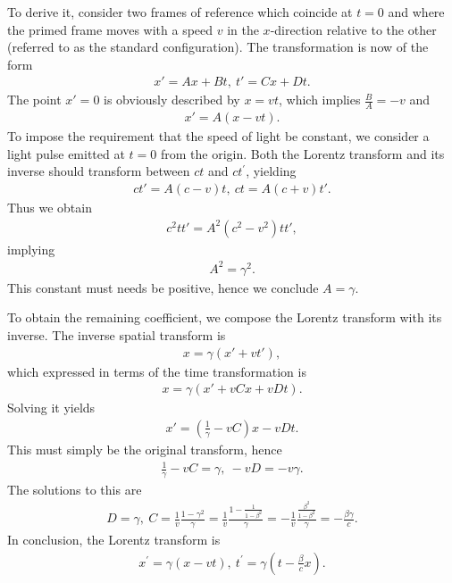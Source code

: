To derive it, consider two frames of reference which coincide at $t = 0$ and where the primed frame moves with a speed $v$ in the $x$-direction relative to the other (referred to as the standard configuration). The transformation is now of the form
\begin{align*}
	x' = Ax + Bt, \ t' = Cx + Dt.
\end{align*}
The point $x' = 0$ is obviously described by $x = vt$, which implies $\frac{B}{A} = -v$ and
\begin{align*}
	x' = A(x - vt).
\end{align*}
To impose the requirement that the speed of light be constant, we consider a light pulse emitted at $t = 0$ from the origin. Both the Lorentz transform and its inverse should transform between $ct$ and $ct^{\prime}$, yielding
\begin{align*}
	ct' = A(c - v)t, \ ct = A(c + v)t'.
\end{align*}
Thus we obtain
\begin{align*}
	c^{2}tt' = A^{2}(c^{2} - v^{2})tt',
\end{align*}
implying
\begin{align*}
	A^{2} = \gamma^{2}.
\end{align*}
This constant must needs be positive, hence we conclude $A = \gamma$.

To obtain the remaining coefficient, we compose the Lorentz transform with its inverse. The inverse spatial transform is
\begin{align*}
	x = \gamma(x' + vt'),
\end{align*}
which expressed in terms of the time transformation is
\begin{align*}
	x = \gamma(x' + vCx + vDt).
\end{align*}
Solving it yields
\begin{align*}
	x' = \left(\frac{1}{\gamma} - vC\right)x - vDt.
\end{align*}
This must simply be the original transform, hence
\begin{align*}
	\frac{1}{\gamma} - vC = \gamma, \ -vD = -v\gamma.
\end{align*}
The solutions to this are
\begin{align*}
	D = \gamma, \ C = \frac{1}{v}\frac{1 - \gamma^{2}}{\gamma} = \frac{1}{v}\frac{1 - \frac{1}{1 - \beta^{2}}}{\gamma} = -\frac{1}{v}\frac{\frac{\beta^{2}}{1 - \beta^{2}}}{\gamma} = -\frac{\beta\gamma}{c}.
\end{align*}
In conclusion, the Lorentz transform is
\begin{align*}
	x^{\prime} = \gamma(x - vt),\ t^{\prime} = \gamma\left(t - \frac{\beta}{c}x\right).
\end{align*}

